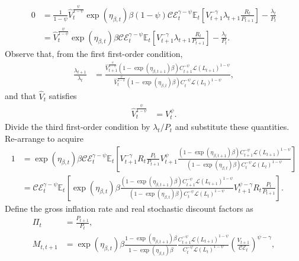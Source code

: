 \documentclass[12 pt, oneside]{article}
\theoremstyle{definition}
\theoremstyle{definition}
\theoremstyle{definition}
\newcommand{\E}{\mathbb{E}}
\newcommand{\calC}{\mathcal{C}}
\newcommand{\calE}{\mathcal{E}}
\newcommand{\calL}{\mathcal{L}}
\begin{document}
\begin{align*}
  0 & = \frac{1}{1 - \psi}\hat{V}_t^{\frac{\psi}{1 - \psi}}\exp(\eta_{\beta, t})\beta(1 - \psi)\calC\calE_t^{\gamma - \psi}\E_t\left[V_{t + 1}^{-\gamma}\lambda_{t + 1}\frac{R_t}{P_{t + 1}}\right] - \frac{\lambda_t}{P_t}\\
    & = \hat{V}_t^{\frac{\psi}{1 - \psi}}\exp(\eta_{\beta, t})\beta\calC\calE_t^{\gamma - \psi}\E_t\left[V_{t + 1}^{-\gamma}\lambda_{t + 1}\frac{R_t}{P_{t + 1}}\right] - \frac{\lambda_t}{P_t}.
\end{align*}
Observe that, from the first first-order condition,
\begin{align*}
  \frac{\lambda_{t + 1}}{\lambda_t} & = \frac{\hat{V}_{t + 1}^{\frac{\psi}{1 - \psi}} (1 - \exp(\eta_{\beta, t + 1})\beta)C_{t + 1}^{-\psi}\calL(L_{t + 1})^{1 - \psi}}{\hat{V}_t^{\frac{\psi}{1 - \psi}} (1 - \exp(\eta_{\beta, t})\beta)C_t^{-\psi}\calL(L_t)^{1 - \psi}},
\end{align*}
and that $\hat{V}_t$ satisfies
\begin{align*}
  \hat{V}_t^{\frac{\psi}{1 - \psi}} & = V_t^\psi.
\end{align*}
Divide the third first-order condition by $\lambda_t/P_t$ and substitute these quantities. Re-arrange to acquire
\begin{align*}
  1 & = \exp(\eta_{\beta, t})\beta\calC\calE_t^{\gamma - \psi}\E_t\left[V_{t + 1}^{-\gamma} R_t \frac{P_t}{P_{t + 1}} V_{t + 1}^{\psi} \frac{(1 - \exp(\eta_{\beta, t + 1})\beta)C_{t + 1}^{-\psi} \calL(L_{t + 1})^{1 - \psi}}{(1 - \exp(\eta_{\beta, t})\beta)C_t^{-\psi}\calL(L_t)^{1 - \psi}} \right]\\
    & = \calC\calE_t^{\gamma - \psi}\E_t\left[\exp(\eta_{\beta, t})\beta\frac{(1 - \exp(\eta_{\beta, t + 1})\beta)C_{t + 1}^{-\psi} \calL(L_{t + 1})^{1 - \psi}}{(1 - \exp(\eta_{\beta, t})\beta)C_t^{-\psi}\calL(L_t)^{1 - \psi}}V_{t + 1}^{\psi - \gamma} R_t\frac{P_t}{P_{t + 1}}  \right].
\end{align*}
Define the gross inflation rate and real stochastic discount factors as
\begin{align}\label{eq:gross inflation rate defn}
  \Pi_t & = \frac{P_{t + 1}}{P_t},\\
  \label{eq:real sdf}
  M_{t, t + 1} & = \exp(\eta_{\beta, t})\beta \frac{1 - \exp(\eta_{\beta, t + 1})\beta}{1 - \exp(\eta_{\beta, t})\beta} \frac{C_{t + 1}^{-\psi}\calL(L_{t + 1})^{1 - \psi}}{C_t^{-\psi}\calL(L_t)^{1 - \psi}}\left(\frac{V_{t + 1}}{\calC\calE_t}\right)^{\psi - \gamma},
\end{align}
\end{document}
